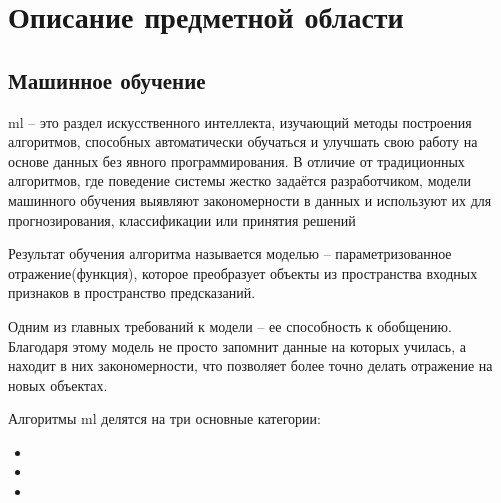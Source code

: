 \documentclass[../document.tex]{subfiles}
\begin{document}
    \section{Описание предметной области}
    \subsection{Машинное обучение}
    \par \acrfull{ml} -- это раздел искусственного интеллекта, изучающий методы построения алгоритмов, способных автоматически обучаться и улучшать свою работу на основе данных без явного программирования. В отличие от традиционных алгоритмов, где поведение системы жестко задаётся разработчиком, модели машинного обучения выявляют закономерности в данных и используют их для прогнозирования, классификации или принятия решений
    \par Результат обучения алгоритма называется моделью -- параметризованное отражение(функция), которое преобразует объекты из пространства входных признаков в пространство предсказаний. 
    \par Одним из главных требований к модели -- ее способность к обобщению. Благодаря этому модель не просто запомнит данные на которых училась, а находит в них закономерности, что позволяет более точно делать отражение на новых объектах.
    \par Алгоритмы \acrshort{ml} делятся на три основные категории:
    \begin{itemize}
        \item {}
        \item {}
        \item {}
    \end{itemize} 

    

    

    

    
    
    
    
    
\end{document}
